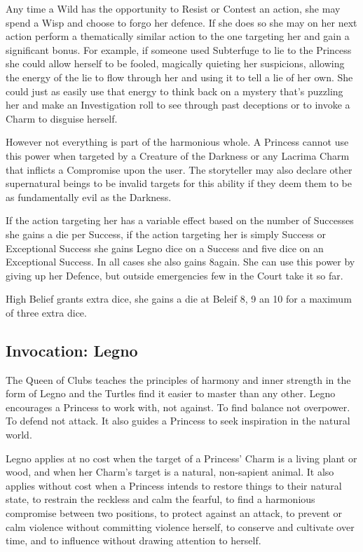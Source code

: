 Any time a Wild has the opportunity to Resist or Contest an action, she may spend a Wisp and choose to forgo her defence. If she does so she may on her next action perform a thematically similar action to the one targeting her and gain a significant bonus. For example, if someone used Subterfuge to lie to the Princess she could allow herself to be fooled, magically quieting her suspicions, allowing the energy of the lie to flow through her and using it to tell a lie of her own. She could just as easily use that energy to think back on a mystery that's puzzling her and make an Investigation roll to see through past deceptions or to invoke a Charm to disguise herself.

However not everything is part of the harmonious whole. A Princess cannot use this power when targeted by a Creature of the Darkness or any Lacrima Charm that inflicts a Compromise upon the user. The storyteller may also declare other supernatural beings to be invalid targets for this ability if they deem them to be as fundamentally evil as the Darkness.

If the action targeting her has a variable effect based on the number of Successes she gains a die per Success, if the action targeting her is simply Success or Exceptional Success she gains Legno dice on a Success and five dice on an Exceptional Success. In all cases she also gains 8again. She can use this power by giving up her Defence, but outside emergencies few in the Court take it so far.

High Belief grants extra dice, she gains a die at Beleif 8, 9 an 10 for a maximum of three extra dice.

\subsection*{Invocation: Legno}

The Queen of Clubs teaches the principles of harmony and inner strength in the form of Legno and the Turtles find it easier to master than any other. Legno encourages a Princess to work with, not against. To find balance not overpower. To defend not attack. It also guides a Princess to seek inspiration in the natural world.

Legno applies at no cost when the target of a Princess' Charm is a living plant or wood, and when her Charm's target is a natural, non-sapient animal. It also applies without cost when a Princess intends to restore things to their natural state, to restrain the reckless and calm the fearful, to find a harmonious compromise between two positions, to protect against an attack, to prevent or calm violence without committing violence herself, to conserve and cultivate over time, and to influence without drawing attention to herself.

